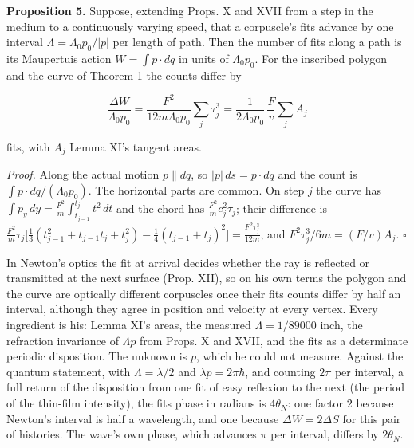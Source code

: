 \documentclass[11pt,a4paper]{article}
\begin{document}
\textbf{Proposition 5.} Suppose, extending Props. X and XVII from a step
in the medium to a continuously varying speed, that a corpuscle's fits
advance by one interval \(\Lambda=\Lambda_0p_0/|p|\) per length of path.
Then the number of fits along a path is its Maupertuis action
\(W=\int p\cdot dq\) in units of \(\Lambda_0p_0\). For the inscribed
polygon and the curve of Theorem 1 the counts differ by

\[\frac{\Delta W}{\Lambda_0p_0}=\frac{F^2}{12m\Lambda_0p_0}\sum_j\tau_j^3
=\frac{1}{2\Lambda_0p_0}\,\frac{F}{v}\sum_jA_j\]

fits, with \(A_j\) Lemma XI's tangent areas.

\emph{Proof.} Along the actual motion \(p\parallel dq\), so
\(|p|\,ds=p\cdot dq\) and the count is
\(\int p\cdot dq/(\Lambda_0p_0)\). The horizontal parts are common. On
step \(j\) the curve has
\(\int p_y\,dy=\frac{F^2}{m}\int_{t_{j-1}}^{t_j}t^2\,dt\) and the chord
has \(\frac{F^2}{m}c_j^2\tau_j\); their difference is
\(\frac{F^2}{m}\tau_j\bigl[\frac13(t_{j-1}^2+t_{j-1}t_j+t_j^2)-\frac14(t_{j-1}+t_j)^2\bigr] =\frac{F^2\tau_j^3}{12m}\),
and \(F^2\tau_j^3/6m=(F/v)A_j\). \(\square\)

In Newton's optics the fit at arrival decides whether the ray is
reflected or transmitted at the next surface (Prop. XII), so on his own
terms the polygon and the curve are optically different corpuscles once
their fits counts differ by half an interval, although they agree in
position and velocity at every vertex. Every ingredient is his: Lemma
XI's areas, the measured \(\Lambda=1/89000\) inch, the refraction
invariance of \(\Lambda p\) from Props. X and XVII, and the fits as a
determinate periodic disposition. The unknown is \(p\), which he could
not measure. Against the quantum statement, with \(\Lambda=\lambda/2\)
and \(\lambda p=2\pi\hbar\), and counting \(2\pi\) per interval, a full
return of the disposition from one fit of easy reflexion to the next
(the period of the thin-film intensity), the fits phase in radians is
\(4\theta_N\): one factor \(2\) because Newton's interval is half a
wavelength, and one because \(\Delta W=2\Delta S\) for this pair of
histories. The wave's own phase, which advances \(\pi\) per interval,
differs by \(2\theta_N\).
\end{document}
